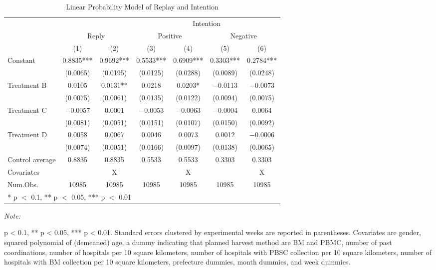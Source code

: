 \documentclass[
  a4paperpaper,
]{article}
\begin{document}
\begin{table}

\caption{Linear Probability Model of Replay and Intention}
\centering
\begin{threeparttable}
\begin{tabular}[t]{lcccccc}
\toprule
\multicolumn{3}{c}{ } & \multicolumn{4}{c}{Intention} \\
\cmidrule(l{3pt}r{3pt}){4-7}
\multicolumn{1}{c}{ } & \multicolumn{2}{c}{Reply} & \multicolumn{2}{c}{Positive} & \multicolumn{2}{c}{Negative} \\
\cmidrule(l{3pt}r{3pt}){2-3} \cmidrule(l{3pt}r{3pt}){4-5} \cmidrule(l{3pt}r{3pt}){6-7}
  & (1) & (2) & (3) & (4) & (5) & (6)\\
\midrule
Constant & \num{0.8835}*** & \num{0.9692}*** & \num{0.5533}*** & \num{0.6909}*** & \num{0.3303}*** & \num{0.2784}***\\
 & (\num{0.0065}) & (\num{0.0195}) & (\num{0.0125}) & (\num{0.0288}) & (\num{0.0089}) & (\num{0.0248})\\
Treatment B & \num{0.0105} & \num{0.0131}** & \num{0.0218} & \num{0.0203}* & \num{-0.0113} & \num{-0.0073}\\
 & (\num{0.0075}) & (\num{0.0061}) & (\num{0.0135}) & (\num{0.0122}) & (\num{0.0094}) & (\num{0.0075})\\
Treatment C & \num{-0.0057} & \num{0.0001} & \num{-0.0053} & \num{-0.0063} & \num{-0.0004} & \num{0.0064}\\
 & (\num{0.0081}) & (\num{0.0051}) & (\num{0.0151}) & (\num{0.0107}) & (\num{0.0150}) & (\num{0.0092})\\
Treatment D & \num{0.0058} & \num{0.0067} & \num{0.0046} & \num{0.0073} & \num{0.0012} & \num{-0.0006}\\
 & (\num{0.0074}) & (\num{0.0051}) & (\num{0.0166}) & (\num{0.0097}) & (\num{0.0138}) & (\num{0.0065})\\
\midrule
Control average & 0.8835 & 0.8835 & 0.5533 & 0.5533 & 0.3303 & 0.3303\\
Covariates &  & X &  & X &  & X\\
Num.Obs. & \num{10985} & \num{10985} & \num{10985} & \num{10985} & \num{10985} & \num{10985}\\
\bottomrule
\multicolumn{7}{l}{\rule{0pt}{1em}* p $<$ 0.1, ** p $<$ 0.05, *** p $<$ 0.01}\\
\end{tabular}
\begin{tablenotes}
\item \textit{Note: } 
\item * p < 0.1, ** p < 0.05, *** p < 0.01. Standard errors clustered by experimental weeks are reported in parentheses. Covariates are gender, squared polynomial of (demeaned) age, a dummy indicating that planned harvest method are BM and PBMC, number of past coordinations, number of hospitals per 10 square kilometers, number of hospitals with PBSC collection per 10 square kilometers, number of hospitals with BM collection per 10 square kilometers, prefecture dummies, month dummies, and week dummies.
\end{tablenotes}
\end{threeparttable}
\end{table}
\end{document}
